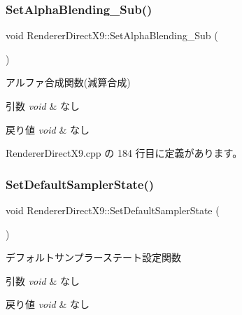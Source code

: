 \subsubsection{\texorpdfstring{Set\+Alpha\+Blending\+\_\+\+Sub()}{SetAlphaBlending\_Sub()}}
{\footnotesize\ttfamily void Renderer\+Direct\+X9\+::\+Set\+Alpha\+Blending\+\_\+\+Sub (\begin{DoxyParamCaption}{ }\end{DoxyParamCaption})}



アルファ合成関数(減算合成) 


\begin{DoxyParams}{引数}
{\em void} & なし \\
\hline
\end{DoxyParams}

\begin{DoxyRetVals}{戻り値}
{\em void} & なし \\
\hline
\end{DoxyRetVals}


 Renderer\+Direct\+X9.\+cpp の 184 行目に定義があります。

\mbox{\label{class_renderer_direct_x9_a229cd266427d96486c43d2e63300e438}} 
\subsubsection{\texorpdfstring{Set\+Default\+Sampler\+State()}{SetDefaultSamplerState()}}
{\footnotesize\ttfamily void Renderer\+Direct\+X9\+::\+Set\+Default\+Sampler\+State (\begin{DoxyParamCaption}{ }\end{DoxyParamCaption})}



デフォルトサンプラーステート設定関数 


\begin{DoxyParams}{引数}
{\em void} & なし \\
\hline
\end{DoxyParams}

\begin{DoxyRetVals}{戻り値}
{\em void} & なし \\
\hline
\end{DoxyRetVals}


